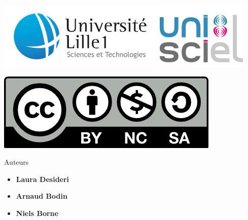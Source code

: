 







\begin{frame}

\thispagestyle{empty}    

  \hspace*{-20ex}
  \begin{minipage}{0.6\textwidth}
  \begin{center}
    \vspace*{5ex}   


    \bigskip

    \includegraphics[scale=0.3]{../divers/logotypeLille1-QUADRI-ECRAN.jpg}
    \quad
    \includegraphics[scale=0.3]{../divers/logo-unisciel.png}

    \vspace*{5ex}

    \includegraphics[scale=0.5]{../divers/by-nc-sa.png}
  \end{center}
  \end{minipage}
  \hfil
  \begin{minipage}{0.50\textwidth}
  \vspace*{5ex}
  Auteurs
  \begin{itemize}
    \item {\bf Laura Desideri}
    \item {\bf Arnaud Bodin}
    \item {\bf Niels Borne}
  \end{itemize}


\end{minipage}
\end{frame}

